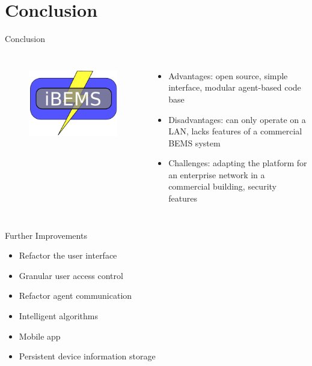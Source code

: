 \documentclass{beamer}
\begin{document}
\section{Conclusion}
\begin{frame}{Conclusion}{} %
  \begin{columns}
    \begin{figure}
      \centering
      \includegraphics[scale=0.8]{figs/logo.pdf}
      \label{fig:logo}
    \end{figure}
    \begin{itemize}
      \item Advantages: open source, simple interface, modular agent-based code base
      \item Disadvantages: can only operate on a LAN, lacks features of a commercial BEMS system
      \item Challenges: adapting the platform for an enterprise network in a commercial building, security features 
    \end{itemize}
  \end{columns}  
\end{frame}

\begin{frame}
  \begin{block}{Further Improvements}
    \begin{itemize}
    \item Refactor the user interface
    \item Granular user access control
    \item Refactor agent communication
    \item Intelligent algorithms
    \item Mobile app
    \item Persistent device information storage
    \end{itemize}
  \end{block}
\end{frame}
\end{document}

